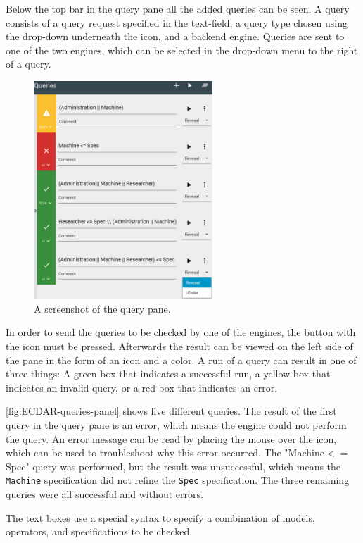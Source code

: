Below the top bar in the query pane all the added queries can be seen. A query consists of a query request specified in the text-field, a query type chosen using the drop-down underneath the icon, and a backend engine. 
Queries are sent to one of the two engines, which can be selected in the drop-down menu to the right of a query. 
\begin{figure}[H]
    \centering
    \includegraphics[width=0.6\textwidth]{common/figures/right-panel.png}
    \caption{A screenshot of the query pane.}
    \label{fig:ECDAR-queries-panel}
\end{figure}

In order to send the queries to be checked by one of the engines, the button with the  icon must be pressed.
Afterwards the result can be viewed on the left side of the pane in the form of an icon and a color.
A run of a query can result in one of three things: A green box that indicates a successful run, a yellow box that indicates an invalid query, or a red box that indicates an error.

\autoref{fig:ECDAR-queries-panel} shows five different queries. 
The result of the first query in the query pane is an error, which means the engine could not perform the query. 
An error message can be read by placing the mouse over the icon, which can be used to troubleshoot why this error occurred.
The "Machine$<=$Spec" query was performed, but the result was unsuccessful, which means the \texttt{Machine} specification did not refine the \texttt{Spec} specification.
The three remaining queries were all successful and without errors.

The text boxes use a special syntax to specify a combination of models, operators, and specifications to be checked.





